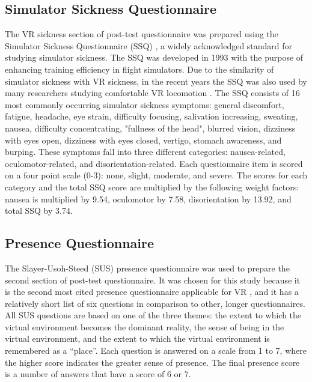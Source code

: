 \subsection{Simulator Sickness Questionnaire}

The VR sickness section of post-test questionnaire was prepared using the Simulator Sickness Questionnaire (SSQ) \cite{SSQ}, a widely acknowledged standard for studying simulator sickness. The SSQ was developed in 1993 with the purpose of enhancing training efficiency in flight simulators. Due to the similarity of simulator sickness with VR sickness, in the recent years the SSQ was also used by many researchers studying comfortable VR locomotion \cite{TELEPORTATIONEFFECTS}\cite{NODEBASEDTELEPORTATION}\cite{SUSMETHODARTICLE}. The SSQ consists of 16 most commonly occurring simulator sickness symptoms: general discomfort, fatigue, headache, eye strain, difficulty focusing, salivation increasing, sweating, nausea, difficulty concentrating, "fullness of the head", blurred vision, dizziness with eyes open, dizziness with eyes closed, vertigo, stomach awareness, and burping. These symptoms fall into three different categories: nausea-related, oculomotor-related, and disorientation-related. Each questionnaire item is scored on a four point scale (0-3): none, slight, moderate, and severe. The scores for each category and the total SSQ score are multiplied by the following weight factors: nausea is multiplied by 9.54, oculomotor by 7.58, disorientation by 13.92, and total SSQ by 3.74.

\subsection{Presence Questionnaire}

The Slayer-Usoh-Steed (SUS) \cite{SUS} presence questionnaire was used to prepare the second section of post-test questionnaire. It was chosen for this study because it is the second most cited presence questionnaire applicable for VR \cite{SUSEVIDENCE}, and it has a relatively short list of six questions in comparison to other, longer questionnaires. All SUS questions are based on one of the three themes: the extent to which the virtual environment becomes the dominant reality, the sense of being in the virtual environment, and the extent to which the virtual environment is remembered as a ``place''. Each question is answered on a scale from 1 to 7, where the higher score indicates the greater sense of presence. The final presence score is a number of answers that have a score of 6 or 7.

